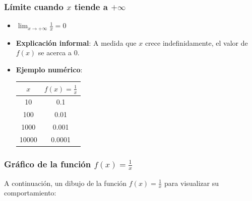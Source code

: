 \documentclass[12pt, a4paper]{article}
\theoremstyle{rioplatense}
\begin{document}
\subsubsection{Límite cuando $x$ tiende a $+\infty$}

\begin{itemize}
    \item %
    $\displaystyle \lim_{x \to +\infty} \frac{1}{x} = 0$

    \item \textbf{Explicación informal}: A medida que $x$ crece indefinidamente, el valor de $f(x)$ se acerca a $0$.

    \item \textbf{Ejemplo numérico}:
    \begin{center}
    \begin{tabular}{|c|c|}
    \hline
    $x$ & $f(x) = \frac{1}{x}$ \\ \hline
    10 & 0.1 \\ \hline
    100 & 0.01 \\ \hline
    1000 & 0.001 \\ \hline
    10000 & 0.0001 \\ \hline
    \end{tabular}
    \end{center}
\end{itemize}

\subsubsection{Gráfico de la función $f(x) = \frac{1}{x}$}

A continuación, un dibujo de la función $f(x) = \frac{1}{x}$ para visualizar su comportamiento:

\begin{center}
\end{center}
\end{document}
